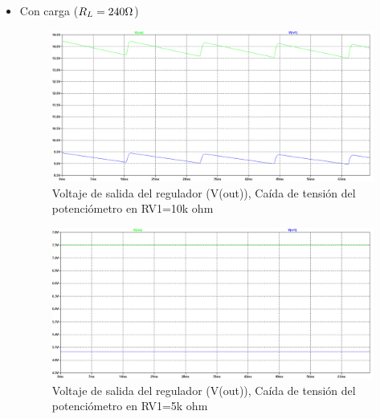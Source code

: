 \begin{enumerate}
\begin{enumerate}
\begin{itemize}
\begin{itemize}
                                \item Con carga ($R_L=240\ohm$)

                                    \begin{figure}[H]
                                        \centering
                                        \renewcommand{\figurename}{Gráfica}
                                        \includegraphics[width=15cm]{Imagenes/sim_regulador_sal_ajustable_conrl1.png}
                                        \caption{Voltaje de salida del regulador (V(out)), Caída de tensión del potenciómetro en RV1=10k ohm}
                                        \label{fig:sim_regulador_sal_ajustable_conrl1}
                                    \end{figure}
        
                                    \begin{figure}[H]
                                        \centering
                                        \renewcommand{\figurename}{Gráfica}
                                        \includegraphics[width=15cm]{Imagenes/sim_regulador_sal_ajustable_conrl2.png}
                                        \caption{Voltaje de salida del regulador (V(out)), Caída de tensión del potenciómetro en RV1=5k ohm}
                                        \label{fig:sim_regulador_sal_ajustable_conrl2}
                                    \end{figure}
        

\end{itemize}
\end{itemize}
\end{enumerate}
\end{enumerate}
